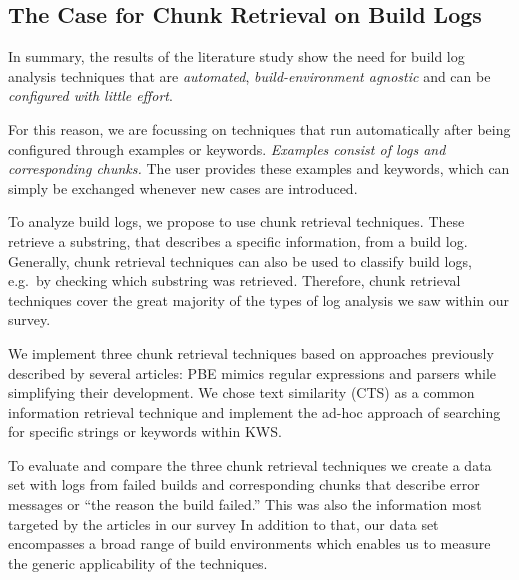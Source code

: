 \subsection{The Case for Chunk Retrieval on Build Logs}
In summary, the results of the literature study show the need for
build log
analysis techniques that are \emph{automated},
\emph{build-environment agnostic}
and can be \emph{configured with little effort}.

For this reason, we are focussing on techniques that run automatically
after being configured through examples or keywords.
\emph{Examples consist of logs and corresponding chunks.}
The user provides these examples and keywords, which can simply be
exchanged whenever new cases are introduced.

To analyze build logs,
we propose to use chunk retrieval techniques.
These retrieve a substring,
that describes a specific information, from a build log.
Generally, chunk retrieval techniques
can also be used to classify build logs, e.g.\ by checking
which substring was retrieved.
Therefore, chunk retrieval techniques
cover the great majority of the types of log analysis we saw within
our survey.

We implement three chunk retrieval techniques based on approaches
previously described by several articles:
PBE mimics regular expressions and parsers while simplifying
their development.
We chose text similarity (CTS) as a common information retrieval
technique and implement the ad-hoc approach of
searching for specific strings or keywords within KWS\@.

To evaluate and compare the three chunk retrieval techniques
we create a data set with logs from failed builds and corresponding
chunks that describe error messages or
``the reason the build failed.''
This was also the information
most targeted by the articles in our survey
In addition to that, our data set encompasses a broad range of
build environments which enables us to measure the generic
applicability of the techniques.


